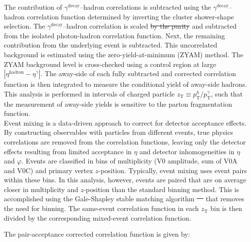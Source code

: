 \documentclass[ALICE,manyauthors]{cernphprep}
\newcommand{\ptgamma}{\ensuremath{p_{\mathrm{T}}^\gamma}}
\newcommand{\pth}{\ensuremath{p_{\mathrm{T}}^h}}
\newcommand{\zt}{\ensuremath{z_{\mathrm{T}}}\xspace}
\newcommand{\ydecay}{\ensuremath{\gamma^\mathrm{decay}}}
\providecommand{\DIFaddtex}[1]{{\protect\color{blue}\uwave{#1}}} %
\providecommand{\DIFdeltex}[1]{{\protect\color{red}\sout{#1}}}                      %
\providecommand{\DIFaddbegin}{} %
\providecommand{\DIFaddend}{} %
\providecommand{\DIFdelbegin}{} %
\providecommand{\DIFdelend}{} %
\providecommand{\DIFadd}[1]{\texorpdfstring{\DIFaddtex{#1}}{#1}} %
\providecommand{\DIFdel}[1]{\texorpdfstring{\DIFdeltex{#1}}{}} %
\newcommand{\DIFscaledelfig}{0.5}
\newlength{\DIFdelgraphicswidth} %
\newlength{\DIFdelgraphicsheight} %
\newcommand{\DIFaddincludegraphics}[2][]{{\color{blue}\fbox{\DIFOincludegraphics[#1]{#2}}}} %
\newcommand{\DIFdelincludegraphics}[2][]{%
\sbox{\DIFdelgraphicsbox}{\DIFOincludegraphics[#1]{#2}}%
\settoboxwidth{\DIFdelgraphicswidth}{\DIFdelgraphicsbox} %
\settoboxtotalheight{\DIFdelgraphicsheight}{\DIFdelgraphicsbox} %
\scalebox{\DIFscaledelfig}{%
\parbox[b]{\DIFdelgraphicswidth}{\usebox{\DIFdelgraphicsbox}\\[-\baselineskip] \rule{\DIFdelgraphicswidth}{0em}}\llap{\resizebox{\DIFdelgraphicswidth}{\DIFdelgraphicsheight}{%
\setlength{\unitlength}{\DIFdelgraphicswidth}%
\begin{picture}(1,1)%
\thicklines\linethickness{2pt} %
{\color[rgb]{1,0,0}\put(0,0){\framebox(1,1){}}}%
{\color[rgb]{1,0,0}\put(0,0){\line( 1,1){1}}}%
{\color[rgb]{1,0,0}\put(0,1){\line(1,-1){1}}}%
\end{picture}%
}\hspace*{3pt}}} %
} %
\DeclareRobustCommand{\DIFaddbegin}{\DIFOaddbegin \let\includegraphics\DIFaddincludegraphics} %
\DeclareRobustCommand{\DIFaddend}{\DIFOaddend \let\includegraphics\DIFOincludegraphics} %
\DeclareRobustCommand{\DIFdelbegin}{\DIFOdelbegin \let\includegraphics\DIFdelincludegraphics} %
\DeclareRobustCommand{\DIFdelend}{\DIFOaddend \let\includegraphics\DIFOincludegraphics} %
\begin{document}
The contribution of {$\ydecay$--hadron} correlations 
is subtracted using the {$\ydecay$--hadron} correlation function determined by inverting the cluster shower-shape selection. The {$\ydecay$--hadron} correlation is scaled \DIFdelbegin \DIFdel{by the purity }\DIFdelend and subtracted from the isolated photon-hadron correlation function.
Next, the remaining contribution from the underlying event is subtracted. This uncorrelated background is estimated using the zero-yield-at-minimum (ZYAM) method. The ZYAM background level is cross-checked using a control region at large $|\eta^{\mathrm{hadron}}-\eta^{\gamma}|$.
The away-side of each fully subtracted and corrected correlation function is then integrated to measure the conditional yield of away-side hadrons.
This analysis is performed in intervals of charged particle $\zt \equiv \pth/\ptgamma$, such that the measurement of away-side yields is sensitive to the parton fragmentation function. \\

Event mixing is a data-driven approach to correct for detector acceptance effects. By constructing observables with particles from different events, true physics correlations are removed from the correlation functions, leaving only the detector effects resulting from limited acceptance in \(\eta\) and detector inhomogeneities in $\eta$ and $\varphi$. Events are classified in bins of multiplicity (V0 amplitude, sum of V0A and V0C) and primary vertex $z$-position. Typically, event mixing uses event pairs within these bins. In this analysis, however, events are paired that are on average closer in multiplicity and $z$-position than the standard binning method. This is accomplished using the Gale-Shapley stable matching algorithm \DIFdelbegin \DIFdel{\mbox{%
\cite{GaleShapley:1962amm} }%
}\DIFdelend \DIFaddbegin \DIFadd{\mbox{%
\cite{doi:10.1137/0402048} }%
}\DIFaddend that removes the need for binning. The same-event correlation function in each $\zt$ bin is then divided by the corresponding mixed-event correlation function. 

The pair-acceptance corrected correlation function is given by:

\end{document}

